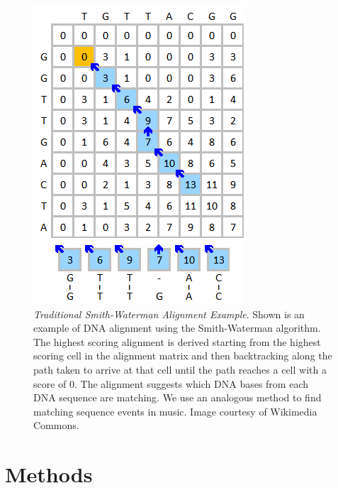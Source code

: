 \documentclass[phd,electronic,oneside,twosidetoc,letterpaper,chaptercenter,parttop,lof,lot]{byumsphd}
\begin{document}
\begin{figure}
	\centering
	\includegraphics[width=.6\linewidth]{swexample}
    \caption{\label{fig:swexample}\textit{Traditional Smith-Waterman Alignment Example}. Shown is an example of DNA alignment using the Smith-Waterman algorithm. The highest scoring alignment is derived starting from the highest scoring cell in the alignment matrix and then backtracking along the path taken to arrive at that cell until the path reaches a cell with a score of 0. The alignment suggests which DNA bases from each DNA sequence are matching. We use an analogous method to find matching sequence events in music. Image courtesy of Wikimedia Commons.}
\end{figure}


\section{Methods}
\end{document}
